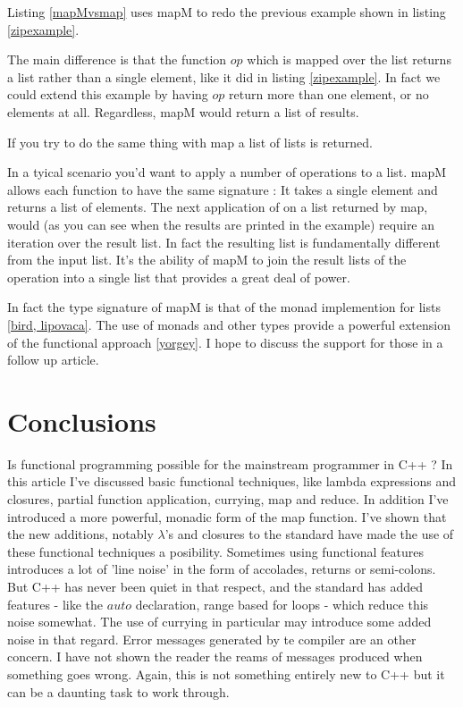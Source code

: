\documentclass[12pt,fleqn]{article}
\begin{document}
Listing \ref{mapMvsmap} uses mapM to redo the previous example shown in listing \ref{zipexample}. 

The main difference is that the function $op$ which is mapped over the list returns a list rather than a single element, like it did in listing \ref{zipexample}.
In fact we could extend this example by having $op$ return more than one element, or no elements at all.
Regardless, mapM would return a list of results.

If you try to do the same thing with map a list of lists is returned.

In a tyical scenario you'd want to apply a number of operations to a list.
mapM allows each function to have the same signature : It takes a single element and returns a list of elements.
The next application of on a list returned by map, would (as you can see when the results are printed in the example) require an iteration over the result list.
In fact the resulting list is fundamentally different from the input list. 
It's the ability of mapM to join the result lists of the operation into a single list that provides a great deal of power.

In fact the type signature of mapM is that of the monad implemention for lists \ref{bird, lipovaca}.
The use of monads and other types provide a powerful extension of the functional approach \ref{yorgey}.
I hope to discuss the support for those in a follow up article.

\section*{Conclusions}
Is functional programming possible for the mainstream programmer in C++ ?
In this article I've discussed basic functional techniques, like lambda expressions and closures, partial function application, currying, map and reduce.
In addition I've  introduced a more powerful, monadic form of the map function.
I've shown that the new additions, notably $\lambda$'s and closures to the standard have made the use of these functional techniques a posibility.
Sometimes using functional features introduces a lot of 'line noise' in the form of accolades, returns or semi-colons.
But C++ has never been quiet in that respect, and the standard has added features - like the $auto$ declaration, range based for loops - which reduce this noise somewhat. 
The use of currying in particular may introduce some added noise in that regard.
Error messages generated by te compiler are an other concern. 
I have not shown the reader the reams of messages produced when something goes wrong.
Again, this is not something entirely new to C++ but it can be a daunting task to work through.
\end{document}
